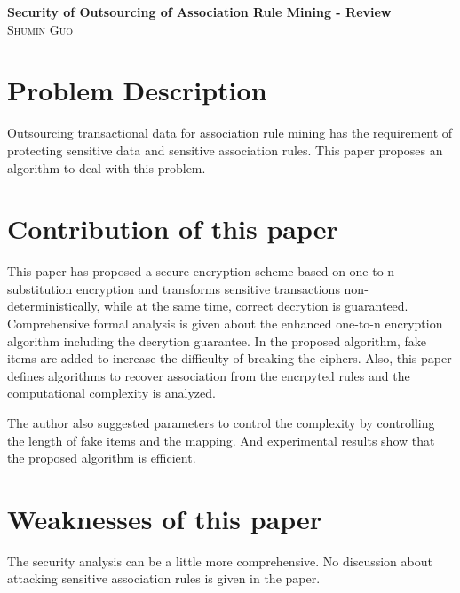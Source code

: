 \documentclass[12pt]{article}
\begin{document}
\begin{center}                  %
\textbf{Security of Outsourcing of Association Rule Mining - Review} \\ 
\small\textsc{Shumin Guo} \\
\end{center}
\section*{Problem Description}

Outsourcing transactional data for association rule mining has the
requirement of protecting sensitive data and sensitive association
rules. This paper proposes an algorithm to deal with this problem.  

\section*{Contribution of this paper}
This paper has proposed a secure encryption scheme based on one-to-n
substitution encryption and transforms sensitive transactions
non-deterministically, while at the same time, correct decrytion is
guaranteed. Comprehensive formal analysis is given about the enhanced
one-to-n encryption algorithm including the decrytion guarantee. In
the proposed algorithm, fake items are added to increase the
difficulty of breaking the ciphers. Also, this paper defines
algorithms to recover association from the encrpyted rules and the
computational complexity is analyzed. 

The author also suggested parameters to control the complexity by
controlling the length of fake items and the mapping. And experimental
results show that the proposed algorithm is efficient. 

\section*{Weaknesses of this paper}
The security analysis can be a little more comprehensive. 
No discussion about attacking sensitive association rules is given in
the paper. 
 
\end{document}
